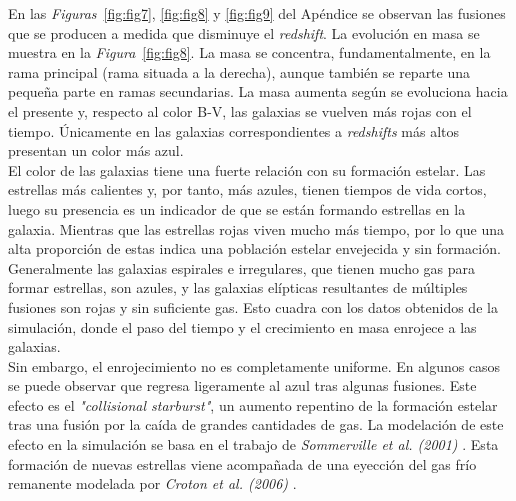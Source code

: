 En las \textit{Figuras}~\ref{fig:fig7}, \ref{fig:fig8} y \ref{fig:fig9} del Apéndice se observan las fusiones que se producen a medida que disminuye el \textit{redshift}. La evolución en masa se muestra en la \textit{Figura}~\ref{fig:fig8}. La masa se concentra, fundamentalmente, en la rama principal (rama situada a la derecha), aunque también se reparte una pequeña parte en ramas secundarias. La masa aumenta según se evoluciona hacia el presente y, respecto al color B-V, las galaxias se vuelven más rojas con el tiempo. Únicamente en las galaxias correspondientes a \textit{redshifts} más altos presentan un color más azul. \\

El color de las galaxias tiene una fuerte relación con su formación estelar. Las estrellas más calientes y, por tanto, más azules, tienen tiempos de vida cortos, luego su presencia es un indicador de que se están formando estrellas en la galaxia. Mientras que las estrellas rojas viven mucho más tiempo, por lo que una alta proporción de estas indica una población estelar envejecida y sin formación. Generalmente las galaxias espirales e irregulares, que tienen mucho gas para formar estrellas, son azules, y las galaxias elípticas resultantes de múltiples fusiones son rojas y sin suficiente gas. Esto cuadra con los datos obtenidos de la simulación, donde el paso del tiempo y el crecimiento en masa enrojece a las galaxias. \\ 

Sin embargo, el enrojecimiento no es completamente uniforme. En algunos casos se puede observar que regresa ligeramente al azul tras algunas fusiones. Este efecto es el \textit{"collisional starburst"}, un aumento repentino de la formación estelar tras una fusión por la caída de grandes cantidades de gas. La modelación de este efecto en la simulación se basa en el trabajo de \textit{Sommerville et al. (2001)} \cite{3}. Esta formación de nuevas estrellas viene acompañada de una eyección del gas frío remanente modelada por \textit{Croton et al. (2006)} \cite{10}.


